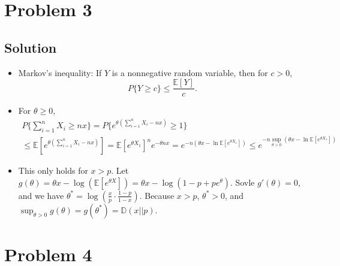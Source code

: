 \documentclass[11pt]{report}
\newcommand{\E}[1]{\mathbb{E}\left[#1\right]}
\begin{document}
\section*{Problem 3}
\subsection*{Solution}
\begin{itemize}
  \item Markov's inequality: If $Y$ is a nonnegative random variable, then for $c > 0$, $$P\{Y \geq c\} \leq \frac{\E{Y}}{c}.$$
  \item For $\theta \geq 0$,
  \begin{multline*}
  P\{\sum_{i=1}^{n}X_i \geq nx\} = P\{e^{\theta(\sum_{i=1}^{n}X_i - nx)} \geq 1\}\\\leq \E{e^{\theta(\sum_{i=1}^{n}X_i - nx)}} = \E{e^{\theta X_1}}^n e^{-\theta n x} = e^{-n(\theta x - \ln\E{e^{\theta X_1}})} \leq e^{-n \sup_{\theta > 0}(\theta x - \ln\E{e^{\theta X_1}})}
  \end{multline*}
  \item This only holds for $x>p$. Let $g(\theta) = \theta x - \log(\E{e^{\theta X}}) = \theta x - \log(1-p+pe^\theta)$. Sovle $g'(\theta) = 0$, and we have $\theta^* = \log(\frac{x}{p} \cdot \frac{1-p}{1-x})$. Because $x>p$, $\theta^* > 0$, and $\sup_{\theta > 0}g(\theta) = g(\theta^*) = \mathbb{D}(x||p)$.
\end{itemize}
\section*{Problem 4}
\end{document}
